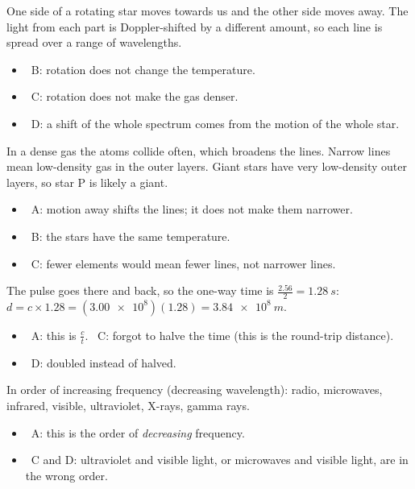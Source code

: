\documentclass[12pt]{article}
\begin{document}
\begin{practiceanswers}
\begin{practiceans}
  One side of a rotating star moves towards us and the other side moves away. The light from each part
  is Doppler-shifted by a different amount, so each line is spread over a range of wavelengths.
  \begin{itemize}
    \item \xmark\ B: rotation does not change the temperature.
    \item \xmark\ C: rotation does not make the gas denser.
    \item \xmark\ D: a shift of the whole spectrum comes from the motion of the whole star.
  \end{itemize}
\end{practiceans}

\begin{practiceans}
  In a dense gas the atoms collide often, which broadens the lines. Narrow lines mean low-density gas
  in the outer layers. Giant stars have very low-density outer layers, so star P is likely a giant.
  \begin{itemize}
    \item \xmark\ A: motion away shifts the lines; it does not make them narrower.
    \item \xmark\ B: the stars have the same temperature.
    \item \xmark\ C: fewer elements would mean fewer lines, not narrower lines.
  \end{itemize}
\end{practiceans}

\begin{practiceans}
  The pulse goes there and back, so the one-way time is $\frac{2.56}{2} = \qty{1.28}{s}$:
  $d = c \times 1.28 = (\num{3.00e8})(1.28) = \qty{3.84e8}{m}$.
  \begin{itemize}
    \item \xmark\ A: this is $\frac{c}{t}$. \quad \xmark\ C: forgot to halve the time (this is the
          round-trip distance).
    \item \xmark\ D: doubled instead of halved.
  \end{itemize}
\end{practiceans}

\begin{practiceans}
  In order of increasing frequency (decreasing wavelength): radio, microwaves, infrared, visible,
  ultraviolet, X-rays, gamma rays.
  \begin{itemize}
    \item \xmark\ A: this is the order of \emph{decreasing} frequency.
    \item \xmark\ C and D: ultraviolet and visible light, or microwaves and visible light, are in the
          wrong order.
  \end{itemize}
\end{practiceans}


\end{practiceanswers}
\end{document}
